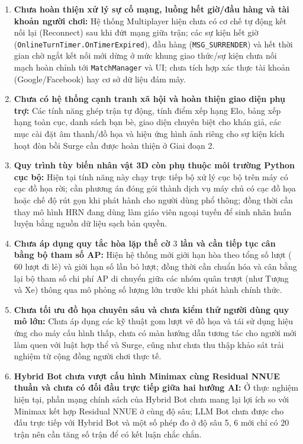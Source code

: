 \begin{enumerate}
    \item \textbf{Chưa hoàn thiện xử lý sự cố mạng, luồng hết giờ/đầu hàng và tài khoản người chơi:} Hệ thống Multiplayer hiện chưa có cơ chế tự động kết nối lại (Reconnect) sau khi đứt mạng giữa trận; các sự kiện hết giờ (\texttt{OnlineTurnTimer.OnTimerExpired}), đầu hàng (\texttt{MSG\_SURRENDER}) và hết thời gian chờ ngắt kết nối mới dừng ở mức khung giao thức/sự kiện chưa nối mạch hoàn chỉnh tới \texttt{MatchManager} và UI; chưa tích hợp xác thực tài khoản (Google/Facebook) hay cơ sở dữ liệu đám mây.
    \item \textbf{Chưa có hệ thống cạnh tranh xã hội và hoàn thiện giao diện phụ trợ:} Các tính năng ghép trận tự động, tính điểm xếp hạng Elo, bảng xếp hạng toàn cục, danh sách bạn bè, giao diện chuyên biệt cho khán giả, các mục cài đặt âm thanh/đồ họa và hiệu ứng hình ảnh riêng cho sự kiện kích hoạt đòn bồi Surge cần được hoàn thiện ở Giai đoạn 2.
    \item \textbf{Quy trình tùy biến nhân vật 3D còn phụ thuộc môi trường Python cục bộ:} Hiện tại tính năng này chạy trực tiếp bộ xử lý cục bộ trên máy có cạc đồ họa rời; cần phương án đóng gói thành dịch vụ máy chủ có cạc đồ họa hoặc chế độ rút gọn khi phát hành cho người dùng phổ thông; đồng thời cần thay mô hình HRN đang dùng làm giáo viên ngoại tuyến để sinh nhãn huấn luyện bằng nguồn dữ liệu sạch bản quyền.
    \item \textbf{Chưa áp dụng quy tắc hòa lặp thế cờ $3$ lần và cần tiếp tục cân bằng bộ tham số AP:} Hiện hệ thống mới giới hạn hòa theo tổng số lượt ($60$ lượt đi lẻ) và giới hạn số lần bỏ lượt; đồng thời cần chuẩn hóa và cân bằng lại bộ tham số chi phí AP di chuyển giữa các nhóm quân trượt (như Tượng và Xe) thông qua mô phỏng số lượng lớn trước khi phát hành chính thức.
    \item \textbf{Chưa tối ưu đồ họa chuyên sâu và chưa kiểm thử người dùng quy mô lớn:} Chưa áp dụng các kỹ thuật gom lượt vẽ đồ họa và tái sử dụng hiệu ứng cho máy cấu hình thấp, chưa có màn hướng dẫn tương tác cho người mới làm quen với luật hợp thể và Surge, cũng như chưa thu thập khảo sát trải nghiệm từ cộng đồng người chơi thực tế.
    \item \textbf{Hybrid Bot chưa vượt cấu hình Minimax cùng Residual NNUE thuần và chưa có đối đầu trực tiếp giữa hai hướng AI:} Ở thực nghiệm hiện tại, phần mạng chính sách của Hybrid Bot chưa mang lại lợi ích so với Minimax kết hợp Residual NNUE ở cùng độ sâu; LLM Bot chưa được cho đấu trực tiếp với Hybrid Bot và một số phép đo ở độ sâu 5, 6 mới chỉ có $20$ trận nên cần tăng số trận để có kết luận chắc chắn.
\end{enumerate}

